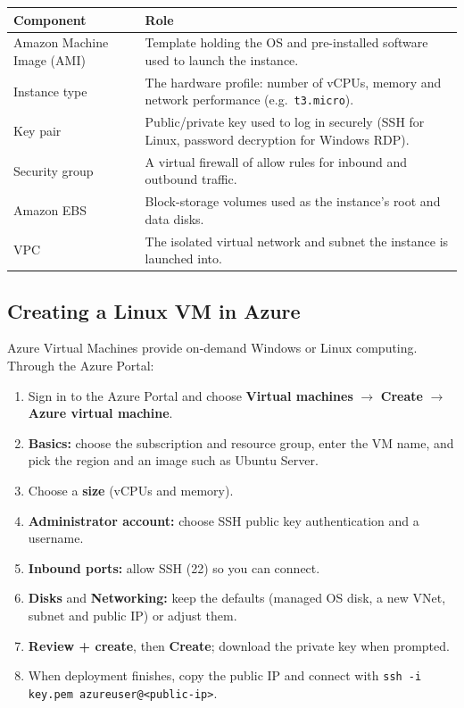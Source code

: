\documentclass[11pt,a4paper]{article}
\begin{document}
\begin{tabularx}{\textwidth}{@{}lX@{}}
\toprule
\rowcolor{tablehead}\textbf{Component} & \textbf{Role} \\
\midrule
Amazon Machine Image (AMI) & Template holding the OS and pre-installed software used to
  launch the instance. \\
Instance type & The hardware profile: number of vCPUs, memory and network performance
  (e.g.\ \texttt{t3.micro}). \\
Key pair & Public/private key used to log in securely (SSH for Linux, password decryption
  for Windows RDP). \\
Security group & A virtual firewall of allow rules for inbound and outbound traffic. \\
Amazon EBS & Block-storage volumes used as the instance's root and data disks. \\
VPC & The isolated virtual network and subnet the instance is launched into. \\
\bottomrule
\end{tabularx}

\subsection{Creating a Linux VM in Azure}

Azure Virtual Machines provide on-demand Windows or Linux computing. Through the Azure
Portal:

\begin{enumerate}\itemsep2pt
  \item Sign in to the Azure Portal and choose \textbf{Virtual machines} $\rightarrow$
        \textbf{Create} $\rightarrow$ \textbf{Azure virtual machine}.
  \item \textbf{Basics:} choose the subscription and resource group, enter the VM name, and
        pick the region and an image such as Ubuntu Server.
  \item Choose a \textbf{size} (vCPUs and memory).
  \item \textbf{Administrator account:} choose SSH public key authentication and a username.
  \item \textbf{Inbound ports:} allow SSH (22) so you can connect.
  \item \textbf{Disks} and \textbf{Networking:} keep the defaults (managed OS disk, a new
        VNet, subnet and public IP) or adjust them.
  \item \textbf{Review + create}, then \textbf{Create}; download the private key when
        prompted.
  \item When deployment finishes, copy the public IP and connect with
        \texttt{ssh -i key.pem azureuser@<public-ip>}.
\end{enumerate}
\end{document}
